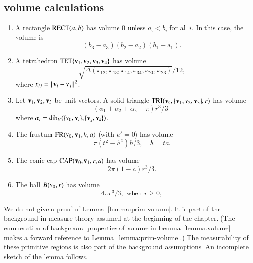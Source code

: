 \subsection{volume calculations}\label{sec:primitive}

\begin{lemma}\label{lemma:prim-volume} 
\begin{enumerate} 
\item{} A rectangle ${\operatorname{RECT}}(a,b)$
has volume $0$ unless $a_i<b_i$ for all $i$.  In this case, the
volume is
\[ (b_3-a_3)(b_2-a_2)(b_1-a_1).\] 
\item{} A tetrahedron ${\operatorname{TET}}\{{\mathbf v}_1,{\mathbf v}_2,{\mathbf v}_3,{\mathbf v}_4\}$
has volume
\[ 
\sqrt{\Delta(x_{12},x_{13},x_{14},x_{34},x_{24},x_{23})}/12,
\] 
where $x_{ij} = \norm{\v_i}{\v_j}^2$.
\item {} Let ${\mathbf v}_1,{\mathbf v}_2,{\mathbf v}_3$ be unit vectors.  A solid
triangle ${\operatorname{TRI}}({\mathbf v}_0,\{{\mathbf v}_1,{\mathbf v}_2,{\mathbf v}_3\},r)$ has
volume
\[ 
(\alpha_1+\alpha_2+\alpha_3-\pi)r^3/3,
\] 
where $\alpha_i = \operatorname{dih}_V(\{{\mathbf v}_0,{\mathbf v}_i\},\{{\mathbf v}_j,{\mathbf v}_k\})$.
\item {} The frustum ${\operatorname{FR}}({\mathbf v}_0,{\mathbf v}_1,h,a)$ (with $h'=0$) 
has volume
\[ 
\pi (t^2-h^2) h/3,\quad h = t a.
\] 
\item {} The conic cap ${\operatorname{CAP}}({\mathbf v}_0,{\mathbf v}_1,r,a)$
has volume
\[ 
2\pi(1-a) r^3/3.
\] 
\item{} The ball $B({\mathbf v}_0,r)$ has volume
\[ 
4\pi r^3/3,\text{ when } r \ge 0,
\] 
\end{enumerate}
\end{lemma}



We do not give a proof of Lemma~\ref{lemma:prim-volume}.  It is part 
of the background in measure theory assumed at the beginning of the chapter.
(The enumeration of background properties of volume in 
Lemma~\ref{lemma:volume} makes a forward
reference to Lemma~\ref{lemma:prim-volume}.)  The measurability
of these primitive regions is also part of the background assumptions.
An incomplete sketch of the lemma follows.

